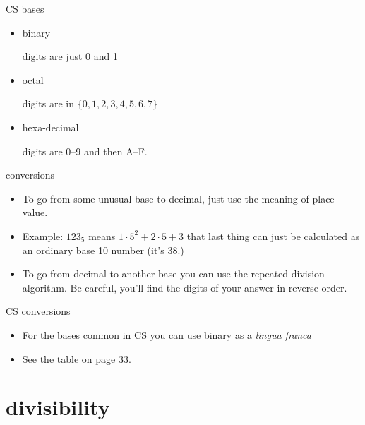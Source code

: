 \documentclass[landscape]{beamer}
\begin{document}
\begin{frame}{CS bases}
\begin{itemize}
\item binary \pause

digits are just 0 and 1 \pause

\item octal \pause

digits are in $\{0, 1, 2, 3, 4, 5, 6, 7 \}$ \pause

\item hexa-decimal \pause

digits are 0--9 and then A--F.

\end{itemize}
\end{frame}

\begin{frame}{conversions}
\begin{itemize}
\item To go from some unusual base to decimal, just use the meaning of place value. \pause
\item Example: $123_5$ means $1\cdot 5^2 + 2 \cdot 5 + 3$ \hspace{12pt} that last thing can just be calculated as an ordinary base 10 number (it's 38.) \pause
\item To go from decimal to another base you can use the repeated division algorithm.  Be careful, you'll find the digits of your answer in reverse order. \pause 
\end{itemize}
\end{frame}

\begin{frame}{CS conversions}
\begin{itemize}
\item For the bases common in CS you can use binary as a {\em lingua franca} \pause
\item See the table on page 33.
\end{itemize}
\end{frame}

\section{divisibility}
\end{document}
